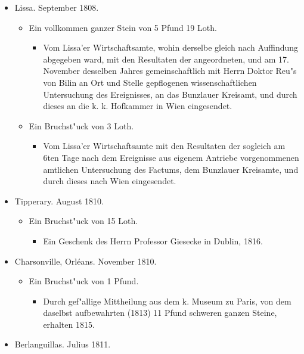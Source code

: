 \documentclass[a4paper, 11pt, oneside, polutonikogreek, german]{article}
\begin{document}
\begin{itemize}
\begin{itemize}
    \end{itemize}
    \item Lissa. September 1808.
    \begin{itemize}
        \item Ein vollkommen ganzer Stein von 5 Pfund 19 Loth.
        \begin{itemize}
            \item Vom Lissa'er Wirtschaftsamte, wohin derselbe gleich nach Auffindung abgegeben ward, mit den Resultaten der angeordneten, und am 17. November desselben Jahres gemeinschaftlich mit Herrn Doktor Reu"s von Bilin an Ort und Stelle gepflogenen wissenschaftlichen Untersuchung des Ereignisses, an das Bunzlauer Kreisamt, und durch dieses an die k. k. Hofkammer in Wien eingesendet.
        \end{itemize}
        \item Ein Bruchst"uck von 3 Loth.
        \begin{itemize}
            \item Vom Lissa'er Wirtschaftsamte mit den Resultaten der sogleich am 6ten Tage nach dem Ereignisse aus eigenem Antriebe vorgenommenen amtlichen Untersuchung des Factums, dem Bunzlauer Kreisamte, und durch dieses nach Wien eingesendet.
        \end{itemize}
    \end{itemize}
    \item Tipperary. August 1810.
    \begin{itemize}
        \item Ein Bruchst"uck von 15 Loth.
        \begin{itemize}
            \item Ein Geschenk des Herrn Professor Giesecke in Dublin, 1816.
        \end{itemize}
    \end{itemize}
    \item Charsonville, Orléans. November 1810.
    \begin{itemize}
        \item Ein Bruchst"uck von 1 Pfund.
        \begin{itemize}
            \item Durch gef"allige Mittheilung aus dem k. Museum zu Paris, von dem daselbst aufbewahrten (1813) 11 Pfund schweren ganzen Steine, erhalten 1815.
        \end{itemize}
    \end{itemize}
    \item Berlanguillas. Julius 1811.

\end{itemize}
\end{document}
